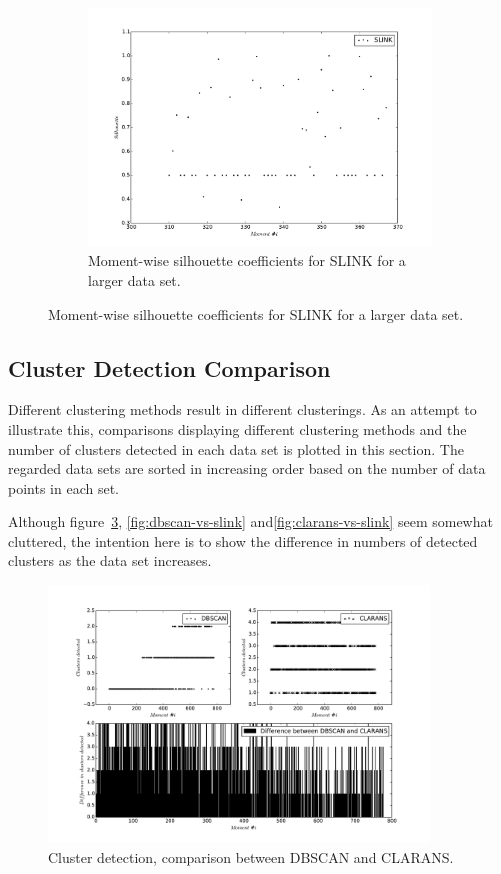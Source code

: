 \begin{figure}[h!]
    \begin{subfigure}[b]{0.45\textwidth}
        \includegraphics[width=\textwidth]{plots/days_slink_silhouette.pdf}
        \caption{Moment-wise silhouette coefficients for SLINK for a larger 
        data set. }
        \label{fig:days-slink-silhouette}
    \end{subfigure}
\end{figure}

\cleartoleftpage

\subsection{Cluster Detection Comparison}
Different clustering methods result in different clusterings. As an 
attempt to illustrate this, comparisons displaying different clustering
methods and the number of clusters detected in each data set is plotted 
in this section. The regarded data sets are sorted in increasing order 
based on the number of data points in each set.

Although figure~\ref{fig:dbscan-vs-clarans}, \ref{fig:dbscan-vs-slink}
and\ref{fig:clarans-vs-slink} seem somewhat cluttered, the intention here is 
to show the difference in numbers of detected clusters as the data set
increases.

\begin{figure}[ht]
    \centering
    \includegraphics[width=0.9\textwidth]{plots/dbscan_vs_clarans.pdf}
    \caption{Cluster detection, comparison between DBSCAN and CLARANS.
    \label{fig:dbscan-vs-clarans} }
\end{figure}

